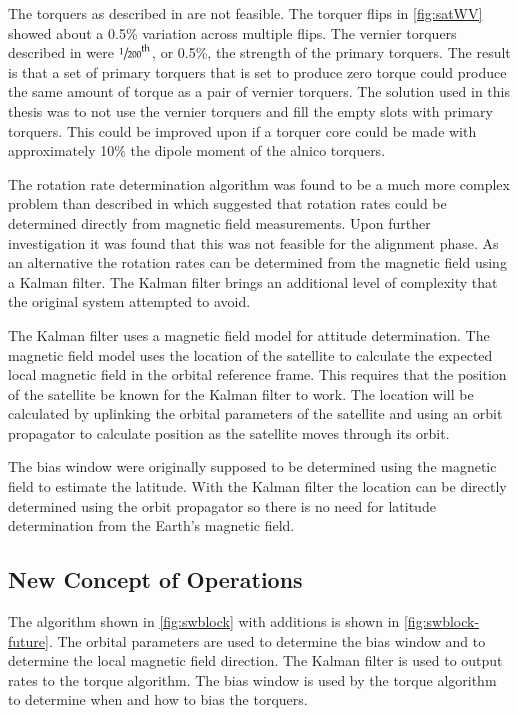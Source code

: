 The torquers as described in \cite{Mentch11} are not feasible. The torquer flips in \cref{fig:satWV} showed about a \textpm{}0.5\% variation across multiple flips. The vernier torquers described in \cite{Mentch11} were $\sfrac{1}{200}^{\mathrm{th}}$, or 0.5\%, the strength of the primary torquers. The result is that a set of primary torquers that is set to produce zero torque could produce the same amount of torque as a pair of vernier torquers. The solution used in this thesis was to not use the vernier torquers and fill the empty slots with primary torquers. This could be improved upon if a torquer core could be made with approximately 10\% the dipole moment of the alnico torquers. 

The rotation rate determination algorithm was found to be a much more complex problem than described in \cite{Mentch11} which suggested that rotation rates could be determined directly from magnetic field measurements. Upon further investigation it was found that this was not feasible for the alignment phase. As an alternative the rotation rates can be determined from the magnetic field using a Kalman filter. The Kalman filter brings an additional level of complexity that the original system attempted to avoid. 

The Kalman filter uses a magnetic field model for attitude determination. The magnetic field model uses the location of the satellite to calculate the expected local magnetic field in the orbital reference frame. This requires that the position of the satellite be known for the Kalman filter to work. The location will be calculated by uplinking the orbital parameters of the satellite and using an orbit propagator to calculate position as the satellite moves through its orbit.

The bias window were originally supposed to be determined using the magnetic field to estimate the latitude. With the Kalman filter the location can be directly determined using the orbit propagator so there is no need for latitude determination from the Earth's magnetic field.

\subsection{New Concept of Operations}

The algorithm shown in \cref{fig:swblock} with additions is shown in \cref{fig:swblock-future}. The orbital parameters are used to determine the bias window and to determine the local magnetic field direction. The Kalman filter is used to output rates to the torque algorithm. The bias window is used by the torque algorithm to determine when and how to bias the torquers.

